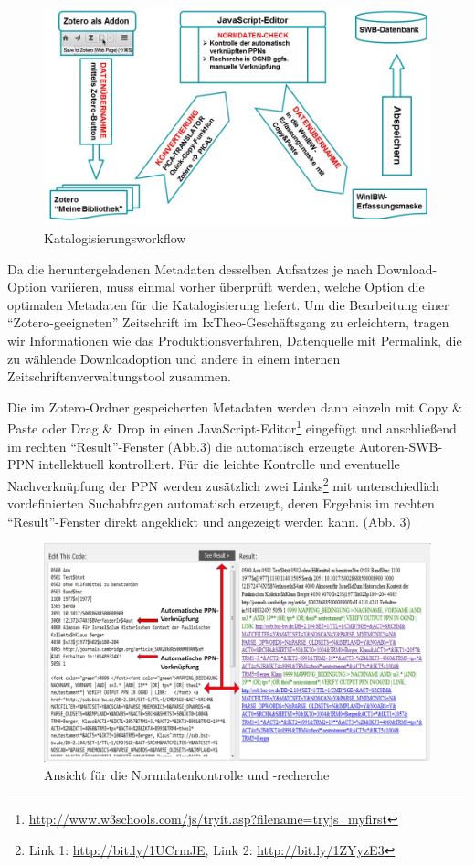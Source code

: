 \documentclass[a4paper,
fontsize=11pt,
oneside,
numbers=noperiodatend,
parskip=half-,
bibliography=totoc,
final
]{scrartcl}
\begin{document}
\begin{figure}[htbp]
\centering
\includegraphics{img/Workflow.jpg}
\caption{Katalogisierungsworkflow}
\end{figure}

Da die heruntergeladenen Metadaten desselben Aufsatzes je nach
Download-Option variieren, muss einmal vorher überprüft werden, welche
Option die optimalen Metadaten für die Katalogisierung liefert. Um die
Bearbeitung einer \enquote{Zotero-geeigneten} Zeitschrift im
IxTheo-Geschäftsgang zu erleichtern, tragen wir Informationen wie das
Produktionsverfahren, Datenquelle mit Permalink, die zu wählende
Downloadoption und andere in einem internen Zeitschriftenverwaltungstool
zusammen.

Die im Zotero-Ordner gespeicherten Metadaten werden dann einzeln mit
Copy \& Paste oder Drag \& Drop in einen JavaScript-Editor\footnote{\url{http://www.w3schools.com/js/tryit.asp?filename=tryjs_myfirst}}
eingefügt und anschließend im rechten \enquote{Result}-Fenster (Abb.3)
die automatisch erzeugte Autoren-SWB-PPN intellektuell kontrolliert. Für
die leichte Kontrolle und eventuelle Nachverknüpfung der PPN werden
zusätzlich zwei Links\footnote{Link 1: \url{http://bit.ly/1UCrmJE}, Link
  2: \url{http://bit.ly/1ZYyzE3}} mit unterschiedlich vordefinierten
Suchabfragen automatisch erzeugt, deren Ergebnis im rechten
\enquote{Result}-Fenster direkt angeklickt und angezeigt werden kann.
(Abb. 3)

\begin{figure}[htbp]
\centering
\includegraphics{img/Normdatenkontrolle.jpg}
\caption{Ansicht für die Normdatenkontrolle und -recherche}
\end{figure}
\end{document}
